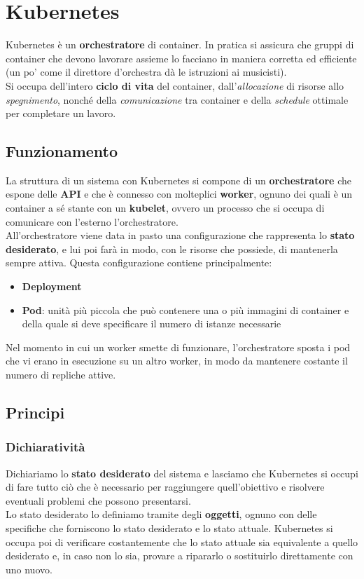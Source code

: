 \newpage
\section{Kubernetes}
Kubernetes è un \textbf{orchestratore} di container. In pratica si assicura che gruppi di container che devono lavorare assieme lo facciano in maniera corretta ed efficiente (un po' come il direttore d'orchestra dà le istruzioni ai musicisti).\\
Si occupa dell'intero \textbf{ciclo di vita} del container, dall'\textit{allocazione} di risorse allo \textit{spegnimento}, nonché della \textit{comunicazione} tra container e della \textit{schedule} ottimale per completare un lavoro.
\subsection{Funzionamento}
La struttura di un sistema con Kubernetes si compone di un \textbf{orchestratore} che espone delle \textbf{API} e che è connesso con molteplici \textbf{worker}, ognuno dei quali è un container a sé stante con un \textbf{kubelet}, ovvero un processo che si occupa di comunicare con l'esterno l'orchestratore.\\
All'orchestratore viene data in pasto una configurazione che rappresenta lo \textbf{stato desiderato}, e lui poi farà in modo, con le risorse che possiede, di mantenerla sempre attiva. Questa configurazione contiene principalmente:
\begin{itemize}
	\item \textbf{Deployment}
	\item \textbf{Pod}: unità più piccola che può contenere una o più immagini di container e della quale si deve specificare il numero di istanze necessarie
\end{itemize}
Nel momento in cui un worker smette di funzionare, l'orchestratore sposta i pod che vi erano in esecuzione su un altro worker, in modo da mantenere costante il numero di repliche attive.
\subsection{Principi}
\subsubsection{Dichiaratività}
Dichiariamo lo \textbf{stato desiderato} del sistema e lasciamo che Kubernetes si occupi di fare tutto ciò che è necessario per raggiungere quell'obiettivo e risolvere eventuali problemi che possono presentarsi.\\
Lo stato desiderato lo definiamo tramite degli \textbf{oggetti}, ognuno con delle specifiche che forniscono lo stato desiderato e lo stato attuale. Kubernetes si occupa poi di verificare costantemente che lo stato attuale sia equivalente a quello desiderato e, in caso non lo sia, provare a ripararlo o sostituirlo direttamente con uno nuovo.
